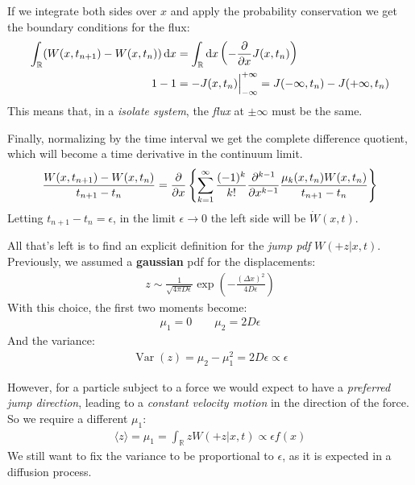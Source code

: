 \documentclass[../template.tex]{subfiles}
\begin{document}
If we integrate both sides over $x$ and apply the probability conservation we get the boundary conditions for the flux:
\begin{align*}
    \int_{\mathbb{R}} (W(x,t_{n+1}) - W(x,t_n)) \dd{x} &= \int_{\mathbb{R}} \dd{x } \left(-\pdv{x} J(x,t_n)\right)\\
    1-1 &= -J(x,t_n) \Big|_{-\infty}^{+\infty} = J(-\infty,t_n) - J(+\infty,t_n)
\end{align*}
This means that, in a \textit{isolate system}, the \textit{flux} at $\pm \infty$ must be the same.  

Finally, normalizing by the time interval we get the complete difference quotient, which will become a time derivative in the continuum limit.
\begin{align}
    \frac{W(x,t_{n+1})- W(x,t_n)}{t_{n+1}-t_n} = \pdv{x} \left\{
    \sum_{k=1}^\infty \frac{(-1)^k}{k!}  \pdv[k-1]{x} \frac{\mu_k(x,t_n) W(x,t_n)}{t_{n+1}-t_n} 
    \right\}
    \label{eqn:rapporto-incrementale} 
\end{align}
Letting $t_{n+1}-t_n=\epsilon$, in the limit $\epsilon \to 0$  the left side will be $\dot{W}(x,t)$.

\medskip

All that's left is to find an explicit definition for the \textit{jump pdf} $W(+z|x,t)$. Previously, we assumed a \textbf{gaussian} pdf for the displacements:
\begin{align*}
    z \sim \frac{1}{\sqrt{4 \pi D \epsilon}}  \exp\left(-\frac{(\Delta x)^2}{4 D \epsilon} \right)
\end{align*} 
With this choice, the first two moments become:
\begin{align*}
    \mu_1 = 0 \qquad \mu_2 = 2 D \epsilon
\end{align*}
And the variance:
\begin{align*}
    \operatorname{Var}(z) =  \mu_2 - \mu_1^2 = 2 D \epsilon \propto \epsilon 
\end{align*}

However, for a particle subject to a force we would expect to have a \textit{preferred jump direction}, leading to a \textit{constant velocity motion} in the direction of the force. So we require a different $\mu_1$: 
\begin{align*}
    \langle z \rangle = \mu_1 = \int_{\mathbb{R}} z W(+z|x,t) \propto \epsilon f(x)
\end{align*} 
We still want to fix the variance to be proportional to $\epsilon$, as it is expected in a diffusion process. 
\end{document}
